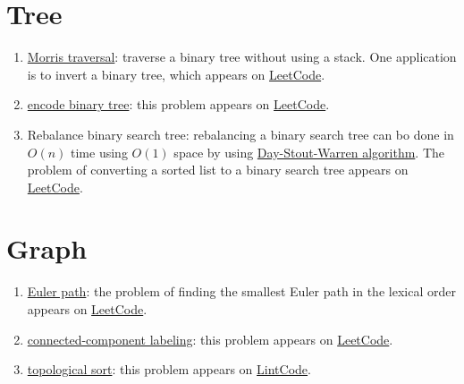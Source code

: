 \section{Tree}
\begin{enumerate}
\item \href{https://en.wikipedia.org/wiki/Tree_traversal#Morris_in-order_traversal_using_threading}{Morris traversal}: traverse a binary tree without using a stack. One application is to invert a binary tree, which appears on \href{https://leetcode.com/problems/invert-binary-tree/}{LeetCode}.
\item \href{https://en.wikipedia.org/wiki/Binary_tree#Encodings}{encode binary tree}: this problem appears on \href{https://leetcode.com/problems/serialize-and-deserialize-binary-tree/}{LeetCode}.
\item Rebalance binary search tree: rebalancing a binary search tree can bo done in $O(n)$ time using $O(1)$ space by using \href{https://en.wikipedia.org/wiki/Day%E2%80%93Stout%E2%80%93Warren_algorithm}{Day-Stout-Warren algorithm}. The problem of converting a sorted list to a binary search tree appears on \href{https://leetcode.com/problems/convert-sorted-list-to-binary-search-tree/}{LeetCode}.
\end{enumerate}

\section{Graph}
\begin{enumerate}
\item \href{https://en.wikipedia.org/wiki/Eulerian_path}{Euler path}: the problem of finding the smallest Euler path in the lexical order appears on \href{https://leetcode.com/problems/reconstruct-itinerary/}{LeetCode}.
\item \href{https://en.wikipedia.org/wiki/Connected-component_labeling}{connected-component labeling}: this problem appears on \href{https://leetcode.com/problems/number-of-islands/}{LeetCode}.
\item \href{https://en.wikipedia.org/wiki/Topological_sorting}{topological sort}: this problem appears on \href{http://www.lintcode.com/en/problem/topological-sorting/}{LintCode}.
\end{enumerate}

\printbibliography[heading=subbibliography]
